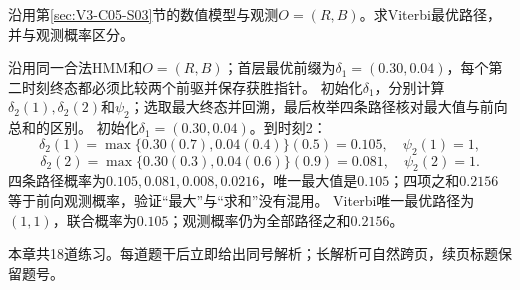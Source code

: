 \label{struct:V3-C05-CH32}
\begin{example}[两状态HMM的Viterbi路径]\label{exm:V3-C05-viterbi-path-rb}
沿用第\ref{sec:V3-C05-S03}节的数值模型与观测$O=(R,B)$。求Viterbi最优路径，并与观测概率区分。

\label{struct:V3-C05-CH33}
\end{example}
\begin{solution}
\SolGiven 沿用同一合法HMM和$O=(R,B)$；首层最优前缀为$\delta_1=(0.30,0.04)$，每个第二时刻终态都必须比较两个前驱并保存获胜指针。
\SolPlan 初始化$\delta_1$，分别计算$\delta_2(1),\delta_2(2)$和$\psi_2$；选取最大终态并回溯，最后枚举四条路径核对最大值与前向总和的区别。
\SolDerive
初始化$\delta_1=(0.30,0.04)$。到时刻2：
\[
\delta_2(1)=\max\{0.30(0.7),0.04(0.4)\}(0.5)=0.105,
\quad\psi_2(1)=1,
\]
\[
\delta_2(2)=\max\{0.30(0.3),0.04(0.6)\}(0.9)=0.081,
\quad\psi_2(2)=1.
\]
\SolCheck 四条路径概率为$0.105,0.081,0.008,0.0216$，唯一最大值是$0.105$；四项之和$0.2156$等于前向观测概率，验证“最大”与“求和”没有混用。
\SolAnswer Viterbi唯一最优路径为$(1,1)$，联合概率为$0.105$；观测概率仍为全部路径之和$0.2156$。
\end{solution}


\label{struct:V3-C05-CH34}
\begingroup
\begin{chapterexercisebox}
\label{struct:V3-C05-CH35}
本章共18道练习。每道题干后立即给出同号解析；长解析可自然跨页，续页标题保留题号。
\end{chapterexercisebox}

